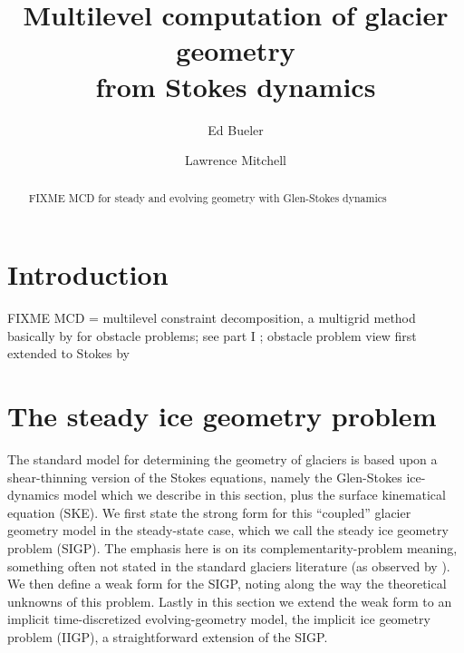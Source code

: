 \documentclass[letterpaper,final,12pt,reqno]{amsart}
\theoremstyle{claim}
\numberwithin{equation}{section}
\numberwithin{figure}{section}
\numberwithin{table}{section}
\numberwithin{theorem}{section}
\begin{document}
\title[Multilevel computation of glacier geometry from Stokes dynamics]{Multilevel computation of glacier geometry \\ from Stokes dynamics}

\author{Ed Bueler}

\author{Lawrence Mitchell}

\begin{abstract} FIXME MCD for steady and evolving geometry with Glen-Stokes dynamics
\end{abstract}

\maketitle


\thispagestyle{empty}

\section{Introduction} \label{sec:intro}

FIXME MCD = multilevel constraint decomposition, a multigrid \cite{Trottenbergetal2001} method basically by \cite{Tai2003} for obstacle problems; see part I \cite{Bueler2022};  obstacle problem view first extended to Stokes by \cite{WirbelJarosch2020}


\section{The steady ice geometry problem} \label{sec:stokesgeometry}

The standard model for determining the geometry of glaciers is based upon a shear-thinning version of the Stokes equations, namely the Glen-Stokes ice-dynamics model which we describe in this section, plus the surface kinematical equation (SKE).  We first state the strong form for this ``coupled'' glacier geometry model in the steady-state case, which we call the steady ice geometry problem (SIGP).  The emphasis here is on its complementarity-problem meaning, something often not stated in the standard glaciers literature (as observed by \cite{SchoofHewitt2013}).  We then define a weak form for the SIGP, noting along the way the theoretical unknowns of this problem.  Lastly in this section we extend the weak form to an implicit time-discretized evolving-geometry model, the implicit ice geometry problem (IIGP), a straightforward extension of the SIGP.
\end{document}
